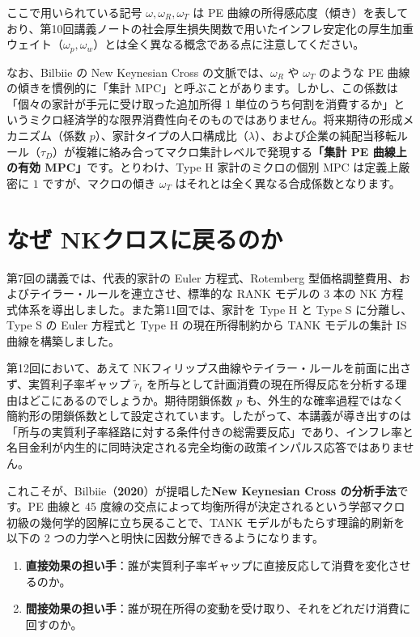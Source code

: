 \documentclass[
  japanese,
  lualatex,
  ja=standard,
  12pt,
  a4paper]{ltjsarticle}
\providecommand{\tightlist}{%
  \setlength{\itemsep}{0pt}\setlength{\parskip}{0pt}}
\begin{document}
ここで用いられている記号 \(\omega, \omega_R, \omega_T\) は PE
曲線の所得感応度（傾き）を表しており、第10回講義ノートの社会厚生損失関数で用いたインフレ安定化の厚生加重ウェイト（\(\omega_p, \omega_w\)）とは全く異なる概念である点に注意してください。

なお、Bilbiie の New Keynesian Cross の文脈では、\(\omega_R\) や
\(\omega_T\) のような PE 曲線の傾きを慣例的に「集計
MPC」と呼ぶことがあります。しかし、この係数は「個々の家計が手元に受け取った追加所得
1
単位のうち何割を消費するか」というミクロ経済学的な限界消費性向そのものではありません。将来期待の形成メカニズム（係数
\(p\)）、家計タイプの人口構成比（\(\lambda\)）、および企業の純配当移転ルール（\(\tau_D\)）が複雑に絡み合ってマクロ集計レベルで発現する\textbf{「集計
PE 曲線上の有効 MPC」}です。とりわけ、Type H 家計のミクロの個別 MPC
は定義上厳密に \(1\) ですが、マクロの傾き \(\omega_T\)
はそれとは全く異なる合成係数となります。


\section{なぜ
NKクロスに戻るのか}\label{ux306aux305c-nkux30afux30edux30b9ux306bux623bux308bux306eux304b}

第7回の講義では、代表的家計の Euler 方程式、Rotemberg
型価格調整費用、およびテイラー・ルールを連立させ、標準的な RANK モデルの
3 本の NK 方程式体系を導出しました。また第11回では、家計を Type H と
Type S に分離し、Type S の Euler 方程式と Type H の現在所得制約から TANK
モデルの集計 IS 曲線を構築しました。

第12回において、あえて
NKフィリップス曲線やテイラー・ルールを前面に出さず、実質利子率ギャップ
\(\widetilde{r}_t\)
を所与として計画消費の現在所得反応を分析する理由はどこにあるのでしょうか。期待閉鎖係数
\(p\)
も、外生的な確率過程ではなく簡約形の閉鎖係数として設定されています。したがって、本講義が導き出すのは「所与の実質利子率経路に対する条件付きの総需要反応」であり、インフレ率と名目金利が内生的に同時決定される完全均衡の政策インパルス応答ではありません。

これこそが、Bilbiie（\textbf{2020}）が提唱した\textbf{New Keynesian
Cross の分析手法}です。PE 曲線と 45
度線の交点によって均衡所得が決定されるという学部マクロ初級の幾何学的図解に立ち戻ることで、TANK
モデルがもたらす理論的刷新を以下の 2
つの力学へと明快に因数分解できるようになります。

\begin{enumerate}
\def\labelenumi{\arabic{enumi}.}
\tightlist
\item
  \textbf{直接効果の担い手}：誰が実質利子率ギャップに直接反応して消費を変化させるのか。
\item
  \textbf{間接効果の担い手}：誰が現在所得の変動を受け取り、それをどれだけ消費に回すのか。
\end{enumerate}
\end{document}
